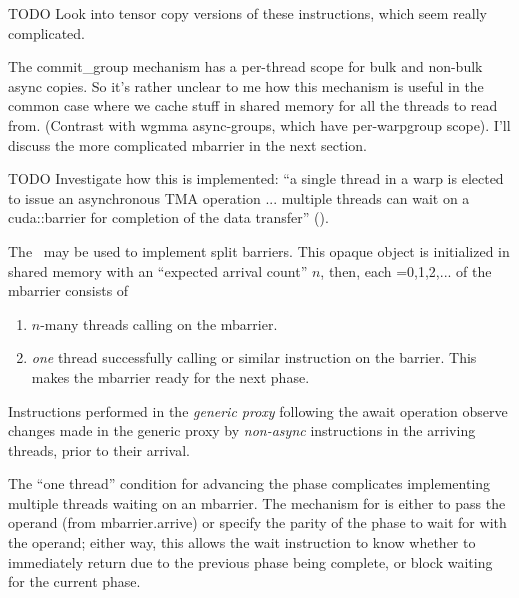\filbreak
TODO Look into tensor copy versions of these instructions, which seem really complicated.


\filbreak
{} The commit\_group mechanism has a per-thread scope for bulk and non-bulk async copies. So it's rather unclear to me how this mechanism is useful in the common case where we cache stuff in shared memory for all the threads to read from. (Contrast with wgmma async-groups, which have per-warpgroup scope). I'll discuss the more complicated mbarrier in the next section.

TODO Investigate how this is implemented: ``a single thread in a warp is elected to issue an asynchronous TMA operation ... multiple threads can wait on a cuda::barrier for completion of the data transfer'' (\hopperBlog).

\filbreak
{}

 The \mbarrier\ may be used to implement split barriers. This opaque object is initialized in shared memory with an ``expected arrival count'' $n$, then, each =0,1,2,... of the mbarrier consists of

\begin{enumerate}
  \item $n$-many threads calling  on the mbarrier.
  \item \textit{one} thread successfully calling  or similar instruction on the barrier. This makes the mbarrier ready for the next phase.
\end{enumerate}

\filbreak
Instructions performed in the \textit{generic proxy} following the await operation observe changes made in the generic proxy by \textit{non-async} instructions in the arriving threads, prior to their arrival.

The ``one thread'' condition for advancing the phase complicates implementing multiple threads waiting on an mbarrier. The mechanism for  is either to pass the  operand (from mbarrier.arrive) or specify the parity of the phase to wait for with the  operand; either way, this allows the wait instruction to know whether to immediately return due to the previous phase being complete, or block waiting for the current phase.

